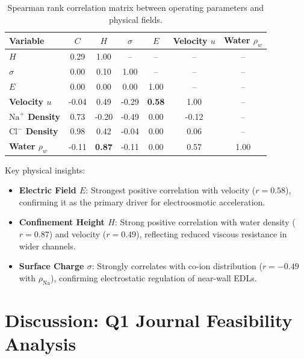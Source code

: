 \documentclass[3p,preprint,12pt,numbers,square,sort&compress]{elsarticle}
\begin{document}
\begin{table}[H]
\centering
\caption{Spearman rank correlation matrix between operating parameters and physical fields.}
\label{tab:spearman}
\begin{tabular}{lcccccc}
\toprule
\textbf{Variable} & \textbf{$C$} & \textbf{$H$} & \textbf{$\sigma$} & \textbf{$E$} & \textbf{Velocity $u$} & \textbf{Water $\rho_w$} \\
\midrule
\textbf{$H$} & 0.29 & 1.00 & -- & -- & -- & -- \\
\textbf{$\sigma$} & 0.00 & 0.10 & 1.00 & -- & -- & -- \\
\textbf{$E$} & 0.00 & 0.00 & 0.00 & 1.00 & -- & -- \\
\textbf{Velocity $u$} & -0.04 & 0.49 & -0.29 & \textbf{0.58} & 1.00 & -- \\
\textbf{$\text{Na}^+$ Density} & 0.73 & -0.20 & -0.49 & 0.00 & -0.12 & -- \\
\textbf{$\text{Cl}^-$ Density} & 0.98 & 0.42 & -0.04 & 0.00 & 0.06 & -- \\
\textbf{Water $\rho_w$} & -0.11 & \textbf{0.87} & -0.11 & 0.00 & 0.57 & 1.00 \\
\bottomrule
\end{tabular}
\end{table}

Key physical insights:
\begin{itemize}
    \item \textbf{Electric Field $E$}: Strongest positive correlation with velocity ($r = 0.58$), confirming it as the primary driver for electroosmotic acceleration.
    \item \textbf{Confinement Height $H$}: Strong positive correlation with water density ($r = 0.87$) and velocity ($r = 0.49$), reflecting reduced viscous resistance in wider channels.
    \item \textbf{Surface Charge $\sigma$}: Strongly correlates with co-ion distribution ($r = -0.49$ with $\rho_{\text{Na}}$), confirming electrostatic regulation of near-wall EDLs.
\end{itemize}

\section{Discussion: Q1 Journal Feasibility Analysis}
\end{document}
